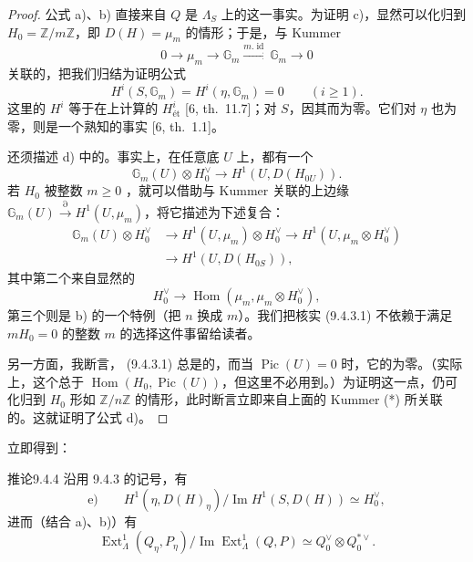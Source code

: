 \begin{proof}
公式 a)、b) 直接来自 $Q$ 是 $\Lambda_S$ 上的这一事实。为证明 c)，显然可以化归到 $H_0=\mathbb Z/m\mathbb Z$，即 $D(H)=\mu_m$ 的情形；于是，与 Kummer 
\[
 0\longrightarrow\mu_m\longrightarrow\mathbb G_m
 \xrightarrow{m.\operatorname{id}}\mathbb G_m\longrightarrow0
\]
关联的，把我们归结为证明公式
\[
 H^i(S,\mathbb G_m)=H^i(\eta,\mathbb G_m)=0\qquad(i\geq1).
\]
这里的 $H^i$ 等于在上计算的 $H^i_{\text{ét}}$ [6, th.~11.7]；对 $S$，因其而为零。它们对 $\eta$ 也为零，则是一个熟知的事实 [6, th.~1.1]。

还须描述 d) 中的。事实上，在任意底 $U$ 上，都有一个
\begin{equation}\tag{9.4.3.1}
 \mathbb G_m(U)\otimes H_0^\vee\longrightarrow H^1(U,D(H_{0U})).
\end{equation}
若 $H_0$ 被整数 $m\geq0$ ，就可以借助与 Kummer 关联的上边缘 $\mathbb G_m(U)\xrightarrow{\partial}H^1(U,\mu_m)$，将它描述为下述复合：
\[
 \begin{aligned}
 \mathbb G_m(U)\otimes H_0^\vee
 &\longrightarrow H^1(U,\mu_m)\otimes H_0^\vee
 \longrightarrow H^1(U,\mu_m\otimes H_0^\vee)\\
 &\longrightarrow H^1(U,D(H_{0S})),
 \end{aligned}
\]
其中第二个来自显然的
\[
 H_0^\vee\longrightarrow\operatorname{Hom}(\mu_m,\mu_m\otimes H_0^\vee),
\]
第三个则是 b) 的一个特例（把 $n$ 换成 $m$）。我们把核实 (9.4.3.1) 不依赖于满足 $mH_0=0$ 的整数 $m$ 的选择这件事留给读者。

另一方面，我断言， (9.4.3.1) 总是的，而当 $\operatorname{Pic}(U)=0$ 时，它的为零。（实际上，这个总于 $\operatorname{Hom}(H_0,\operatorname{Pic}(U))$，但这里不必用到。）为证明这一点，仍可化归到 $H_0$ 形如 $\mathbb Z/n\mathbb Z$ 的情形，此时断言立即来自上面的 Kummer  (*) 所关联的。这就证明了公式 d)。
\end{proof}
立即得到：
\begin{SGAresult}{推论}{9.4.4}
沿用 9.4.3 的记号，有
\[
 \text{e)}\qquad
 H^1(\eta,D(H)_\eta)/\operatorname{Im}H^1(S,D(H))\simeq H_0^\vee,
\]
进而（结合 a)、b)）有
\begin{equation}\tag{9.4.5}
 \operatorname{Ext}^1_\Lambda(Q_\eta,P_\eta)/\operatorname{Im}\operatorname{Ext}^1_\Lambda(Q,P)
 \simeq Q_0^\vee\otimes Q_0^{*\vee}.
\end{equation}
\end{SGAresult}

